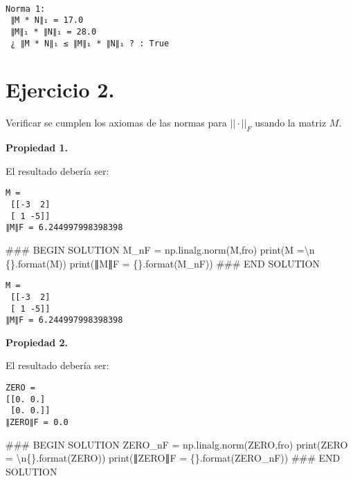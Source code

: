 \documentclass[
  letterpaper,
  DIV=11,
  numbers=noendperiod]{scrreprt}
\newenvironment{Shaded}{\begin{snugshade}}{\end{snugshade}}
\newcommand{\BuiltInTok}[1]{\textcolor[rgb]{0.00,0.23,0.31}{#1}}
\newcommand{\CharTok}[1]{\textcolor[rgb]{0.13,0.47,0.30}{#1}}
\newcommand{\CommentTok}[1]{\textcolor[rgb]{0.37,0.37,0.37}{#1}}
\newcommand{\NormalTok}[1]{\textcolor[rgb]{0.00,0.23,0.31}{#1}}
\newcommand{\OperatorTok}[1]{\textcolor[rgb]{0.37,0.37,0.37}{#1}}
\newcommand{\RegionMarkerTok}[1]{\textcolor[rgb]{0.00,0.23,0.31}{#1}}
\newcommand{\SpecialCharTok}[1]{\textcolor[rgb]{0.37,0.37,0.37}{#1}}
\newcommand{\StringTok}[1]{\textcolor[rgb]{0.13,0.47,0.30}{#1}}
\begin{document}
\begin{verbatim}

Norma 1:
 ∥M * N∥₁ = 17.0
 ∥M∥₁ * ∥N∥₁ = 28.0
 ¿ ∥M * N∥₁ ≤ ∥M∥₁ * ∥N∥₁ ? : True
\end{verbatim}

\section{\texorpdfstring{\textbf{Ejercicio
2.}}{Ejercicio 2.}}\label{ejercicio-2.-3}

Verificar se cumplen los axiomas de las normas para \(||\cdot||_F\)
usando la matriz \(M\).

\textbf{Propiedad 1.}

El resultado debería ser:

\begin{verbatim}
M =
 [[-3  2]
 [ 1 -5]]
∥M∥F = 6.244997998398398
\end{verbatim}

\begin{Shaded}
\begin{Highlighting}[]
\CommentTok{\#\#\# }\RegionMarkerTok{BEGIN}\CommentTok{ SOLUTION}
\NormalTok{M\_nF }\OperatorTok{=}\NormalTok{ np.linalg.norm(M,}\StringTok{\textquotesingle{}fro\textquotesingle{}}\NormalTok{)}
\BuiltInTok{print}\NormalTok{(}\StringTok{\textquotesingle{}M =}\CharTok{\textbackslash{}n}\StringTok{ }\SpecialCharTok{\{\}}\StringTok{\textquotesingle{}}\NormalTok{.}\BuiltInTok{format}\NormalTok{(M))}
\BuiltInTok{print}\NormalTok{(}\StringTok{\textquotesingle{}∥M∥F = }\SpecialCharTok{\{\}}\StringTok{\textquotesingle{}}\NormalTok{.}\BuiltInTok{format}\NormalTok{(M\_nF))}
\CommentTok{\#\#\# }\RegionMarkerTok{END}\CommentTok{ SOLUTION}
\end{Highlighting}
\end{Shaded}

\begin{verbatim}
M =
 [[-3  2]
 [ 1 -5]]
∥M∥F = 6.244997998398398
\end{verbatim}

\textbf{Propiedad 2.}

El resultado debería ser:

\begin{verbatim}
ZERO = 
[[0. 0.]
 [0. 0.]]
∥ZERO∥F = 0.0
\end{verbatim}

\begin{Shaded}
\begin{Highlighting}[]
\CommentTok{\#\#\# }\RegionMarkerTok{BEGIN}\CommentTok{ SOLUTION}
\NormalTok{ZERO\_nF }\OperatorTok{=}\NormalTok{ np.linalg.norm(ZERO,}\StringTok{\textquotesingle{}fro\textquotesingle{}}\NormalTok{)}
\BuiltInTok{print}\NormalTok{(}\StringTok{\textquotesingle{}ZERO = }\CharTok{\textbackslash{}n}\SpecialCharTok{\{\}}\StringTok{\textquotesingle{}}\NormalTok{.}\BuiltInTok{format}\NormalTok{(ZERO))}
\BuiltInTok{print}\NormalTok{(}\StringTok{\textquotesingle{}∥ZERO∥F = }\SpecialCharTok{\{\}}\StringTok{\textquotesingle{}}\NormalTok{.}\BuiltInTok{format}\NormalTok{(ZERO\_nF))}
\CommentTok{\#\#\# }\RegionMarkerTok{END}\CommentTok{ SOLUTION}
\end{Highlighting}
\end{Shaded}
\end{document}
